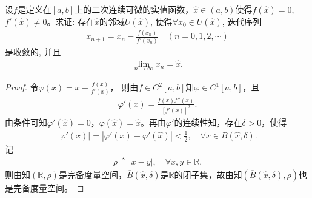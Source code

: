 \documentclass[../../main.tex]{subfiles}%
\begin{document}
\begin{example}[Newton法]

设$f$是定义在$[a,b]$上的二次连续可微的实值函数，$\widehat{x} \in (a,b)$使得$f(\widehat{x})=0$, $f'(\widehat{x}) \neq 0$。求证: 存在$\widehat{x}$的邻域$U(\widehat{x})$, 使得$\forall x_0 \in U(\widehat{x})$, 迭代序列
\begin{align*}
x_{n+1} = x_n - \frac{f(x_n)}{f'(x_n)} \quad (n=0,1,2,\cdots)
\end{align*}
是收敛的, 并且
\begin{align*}
\lim\limits_{n\to\infty} x_n = \widehat{x}.
\end{align*}
\end{example}
\begin{proof}

令$\varphi(x)=x-\frac{f(x)}{f'(x)}$，
则由$f\in C^2[a,b]$知$\varphi\in C^1[a,b]$，且
\begin{align*}
\varphi'(x)=\frac{f(x)f''(x)}{[f'(x)]^2}.
\end{align*}
由条件可知$\varphi'(\widehat{x})=0$，$\varphi(\widehat{x})=\widehat{x}$。再由$\varphi'$的连续性知，存在$\delta>0$，使得
\begin{align*}
|\varphi'(x)|=|\varphi'(x)-\varphi'(\widehat{x})|<\frac{1}{2},\quad \forall x\in \overline{B}(\widehat{x},\delta).
\end{align*}
记
\begin{align*}
\rho\triangleq |x-y|,\quad \forall x,y\in\mathbb{R}.
\end{align*}
则由知$(\mathbb{R},\rho)$是完备度量空间，$\overline{B}(\widehat{x},\delta)$是$\mathbb{R}$的闭子集，故由知$(\overline{B}(\widehat{x},\delta),\rho)$也是完备度量空间。


\end{proof}
\end{document}
